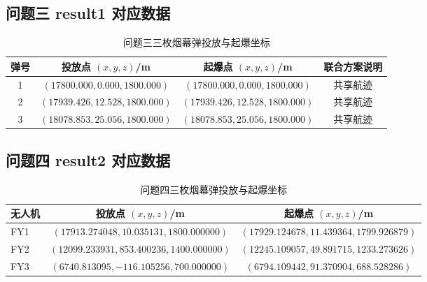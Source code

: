 \subsection{问题三 result1 对应数据}
\begin{table}[H]
\centering
\caption{问题三三枚烟幕弹投放与起爆坐标}
\small
\begin{tabular}{cccc}
\toprule
弹号 & 投放点 $(x,y,z)$/m & 起爆点 $(x,y,z)$/m & 联合方案说明 \\
\midrule
1 & $(17800.000,0.000,1800.000)$ & $(17800.000,0.000,1800.000)$ & 共享航迹 \\
2 & $(17939.426,12.528,1800.000)$ & $(17939.426,12.528,1800.000)$ & 共享航迹 \\
3 & $(18078.853,25.056,1800.000)$ & $(18078.853,25.056,1800.000)$ & 共享航迹 \\
\bottomrule
\end{tabular}
\end{table}

\subsection{问题四 result2 对应数据}
\begin{table}[H]
\centering
\caption{问题四三枚烟幕弹投放与起爆坐标}
\scriptsize
\begin{tabular}{lcc}
\toprule
无人机 & 投放点 $(x,y,z)$/m & 起爆点 $(x,y,z)$/m \\
\midrule
FY1 & $(17913.274048,10.035131,1800.000000)$ & $(17929.124678,11.439364,1799.926879)$ \\
FY2 & $(12099.233931,853.400236,1400.000000)$ & $(12245.109057,49.891715,1233.273626)$ \\
FY3 & $(6740.813095,-116.105256,700.000000)$ & $(6794.109442,91.370904,688.528286)$ \\
\bottomrule
\end{tabular}
\end{table}


